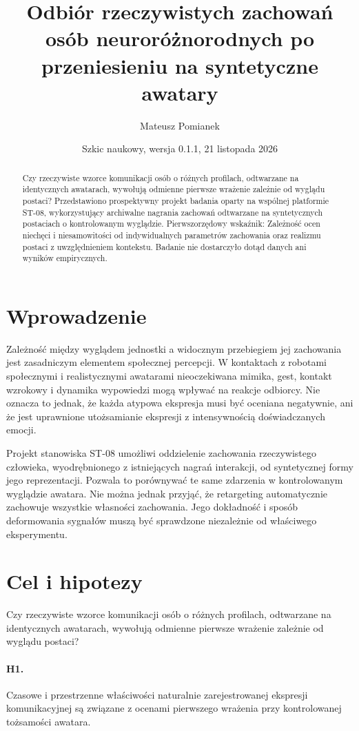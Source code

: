 \documentclass[11pt,a4paper]{article}
\title{Odbiór rzeczywistych zachowań osób neuroróżnorodnych po przeniesieniu na syntetyczne awatary}
\author{Mateusz Pomianek}
\date{Szkic naukowy, wersja 0.1.1, 21 listopada 2026}
\begin{document}
\maketitle
\begin{abstract}
Czy rzeczywiste wzorce komunikacji osób o różnych profilach, odtwarzane na identycznych awatarach, wywołują odmienne pierwsze wrażenie zależnie od wyglądu postaci? Przedstawiono prospektywny projekt badania oparty na wspólnej platformie ST-08, wykorzystujący archiwalne nagrania zachowań odtwarzane na syntetycznych postaciach o kontrolowanym wyglądzie. Pierwszorzędowy wskaźnik: Zależność ocen niechęci i niesamowitości od indywidualnych parametrów zachowania oraz realizmu postaci z uwzględnieniem kontekstu. Badanie nie dostarczyło dotąd danych ani wyników empirycznych.
\end{abstract}
\section{Wprowadzenie}
Zależność między wyglądem jednostki a widocznym przebiegiem jej zachowania jest zasadniczym elementem społecznej percepcji. W kontaktach z robotami społecznymi i realistycznymi awatarami nieoczekiwana mimika, gest, kontakt wzrokowy i dynamika wypowiedzi mogą wpływać na reakcje odbiorcy. Nie oznacza to jednak, że każda atypowa ekspresja musi być oceniana negatywnie, ani że jest uprawnione utożsamianie ekspresji z intensywnością doświadczanych emocji.

Projekt stanowiska ST-08 umożliwi oddzielenie zachowania rzeczywistego człowieka, wyodrębnionego z istniejących nagrań interakcji, od syntetycznej formy jego reprezentacji. Pozwala to porównywać te same zdarzenia w kontrolowanym wyglądzie awatara. Nie można jednak przyjąć, że retargeting automatycznie zachowuje wszystkie własności zachowania. Jego dokładność i sposób deformowania sygnałów muszą być sprawdzone niezależnie od właściwego eksperymentu.
\section{Cel i hipotezy}
Czy rzeczywiste wzorce komunikacji osób o różnych profilach, odtwarzane na identycznych awatarach, wywołują odmienne pierwsze wrażenie zależnie od wyglądu postaci?
\paragraph{H1.} Czasowe i przestrzenne właściwości naturalnie zarejestrowanej ekspresji komunikacyjnej są związane z ocenami pierwszego wrażenia przy kontrolowanej tożsamości awatara.
\end{document}
